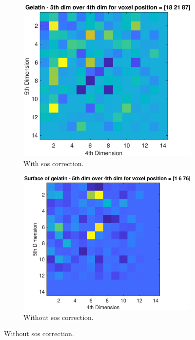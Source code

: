 \begin{figure}[H]
\begin{subfigure}[b]{0.47\textwidth}
         \includegraphics[width=1.02\textwidth]{Graphics/Results/14_vecs_sos_vs_noSos/5thdim_over4D_with_sos_pulp.eps}
         \caption{With \ac{sos} correction.}
         \label{leer}
     \end{subfigure}
          \hfill
     \begin{subfigure}[b]{0.47\textwidth}
         \centering
         \includegraphics[width=1.02\textwidth]{Graphics/Results/14_vecs_sos_vs_noSos/5thdim_over4D_no_sos_skin.eps}
         \caption{Without \ac{sos} correction.}

\end{subfigure}
\end{figure}
